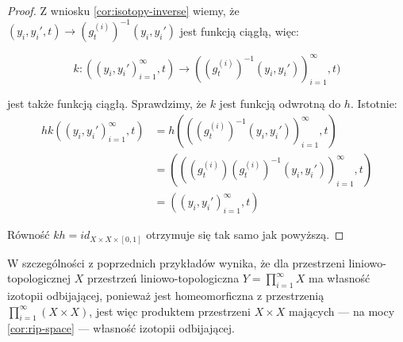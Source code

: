 \begin{ex}
\begin{proof}
    Z wniosku \ref{cor:isotopy-inverse} wiemy, że $(y_i, y_i', t) \rightarrow (g_t^{(i)})^{-1}(y_i, y_i')$ jest funkcją ciągłą, więc:
    
    \[
      k: ((y_i, y_i')_{i=1}^\infty, t) \rightarrow ((g_t^{(i)})^{-1}(y_i, y_i'))_{i=1}^\infty, t)
    \]
    
    jest także funkcją ciągłą. Sprawdzimy, że $k$ jest funkcją odwrotną do $h$. Istotnie:
    \begin{align*}
      hk((y_i, y_i')_{i=1}^\infty, t) &= h(((g_t^{(i)})^{-1}(y_i, y_i'))_{i=1}^\infty, t) \\
      &= (((g_t^{(i)})(g_t^{(i)})^{-1}(y_i, y_i'))_{i=1}^\infty, t) \\
      &= ((y_i, y_i')_{i=1}^\infty, t)
    \end{align*}
    
    Równość $kh = id_{X \times X \times [0,1]}$ otrzymuje się tak samo jak powyższą.

  \end{proof}
\end{ex}

\begin{ex}
  W szczególności z poprzednich przykładów wynika, że dla przestrzeni liniowo-topologicznej $X$ przestrzeń liniowo-topologiczna $Y = \prod_{i=1}^\infty X$ ma własność izotopii odbijającej, ponieważ jest homeomorficzna z przestrzenią $\prod_{i=1}^\infty (X \times X)$, jest więc produktem przestrzeni $X \times X$ mających --- na mocy \ref{cor:rip-space} --- własność izotopii odbijającej.
\end{ex}